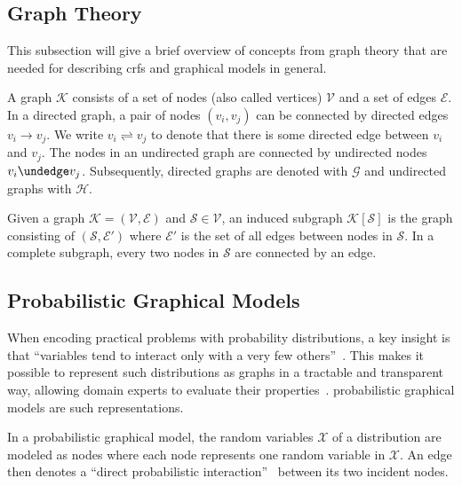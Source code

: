 \subsection{Graph Theory}\label{subsec:graph-theory}

This subsection will give a brief overview of concepts from graph theory that are needed for describing \glspl{crf} and graphical models in general.

\bigskip

A \gls{graph} $\mathcal{K}$ consists of a set of \glspl{node} (also called vertices) $\mathcal{V}$ and a set of \glspl{edge} $\mathcal{E}$.
In a directed \gls{graph}, a pair of \glspl{node} $(v_i,v_j)$ can be connected by directed \glspl{edge} $v_i\to v_j$.
We write $v_i\rightleftharpoons v_j$ to denote that there is some directed edge between $v_i$ and $v_j$.
The \glspl{node} in an undirected graph are connected by undirected \glspl{node} $v_i\undedge v_j$.
Subsequently, directed \glspl{graph} are denoted with $\mathcal{G}$ and undirected \glspl{graph} with $\mathcal{H}$.

Given a \gls{graph} $\mathcal{K} = (\mathcal{V},\mathcal{E})$ and $\mathcal{S}\in\mathcal{V}$, an induced \gls{subgraph} $\mathcal{K}[\mathcal{S}]$ is the \gls{graph} consisting of $(\mathcal{S},\mathcal{E'})$ where $\mathcal{E'}$ is the set of all \glspl{edge} between \glspl{node} in $\mathcal{S}$.
In a complete \gls{subgraph}, every two \glspl{node} in $\mathcal{S}$ are connected by an \gls{edge}.

\subsection{Probabilistic Graphical Models}\label{subsec:graphical-models}
When encoding practical problems with \glspl{probability distribution}, a key insight is that ``variables tend to interact only with a very few others''~\citep{koller2009probabilistic}.
This makes it possible to represent such distributions as graphs in a tractable and transparent way, allowing domain experts to evaluate their properties~\citep{koller2009probabilistic}.
\Glspl{probabilistic graphical model} are such representations.

\bigskip

In a \gls{probabilistic graphical model}, the \glspl{random variable} $\mathcal{X}$ of a distribution are modeled as \glspl{node} where each \gls{node} represents one \gls{random variable} in $\mathcal{X}$. An \gls{edge} then denotes a ``direct probabilistic interaction''~\citep{koller2009probabilistic} between its two incident \glspl{node}.

